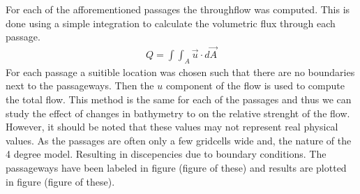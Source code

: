For each of the afforementioned passages the throughflow was computed. This is done using a simple integration to calculate the volumetric flux through each passage.
\begin{align}
	Q = \int \int_A \vec{u} \cdot d\vec{A}
\end{align}	
For each passage a suitible location was chosen such that there are no boundaries next to the passageways. Then the $u$ component of the flow is used to compute the total flow. This method is the same for each of the passages and thus we can study the effect of changes in bathymetry to on the relative strenght of the flow. However, it should be noted that these values may not represent real physical values. As the passages are often only a few gridcells wide and, the nature of the 4 degree model. Resulting in discepencies due to boundary conditions. The passageways have been labeled in figure (figure of these) and results are plotted in figure (figure of these).